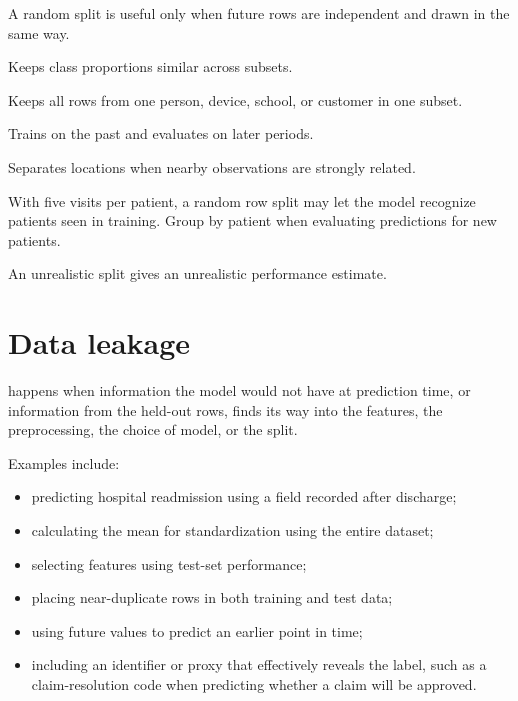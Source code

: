 A random split is useful only when future rows are independent and drawn in the same way.

\begin{description}[leftmargin=1.35in,style=nextline]
  \item[Stratified split] Keeps class proportions similar across subsets.
  \item[Group split] Keeps all rows from one person, device, school, or customer in one subset.
  \item[Time split] Trains on the past and evaluates on later periods.
  \item[Spatial split] Separates locations when nearby observations are strongly related.
\end{description}

\begin{workedexample}
With five visits per patient, a random row split may let the model recognize patients seen in training. Group by patient when evaluating predictions for new patients.
\end{workedexample}

\begin{pitfall}
An unrealistic split gives an unrealistic performance estimate.
\end{pitfall}

\section{Data leakage}
\label{sec:data-leakage}

 happens when information the model would not have at prediction time, or information from the held-out rows, finds its way into the features, the preprocessing, the choice of model, or the split.

Examples include:

\begin{itemize}
  \item predicting hospital readmission using a field recorded after discharge;
  \item calculating the mean for standardization using the entire dataset;
  \item selecting features using test-set performance;
  \item placing near-duplicate rows in both training and test data;
  \item using future values to predict an earlier point in time;
  \item including an identifier or proxy that effectively reveals the label, such as a claim-resolution code when predicting whether a claim will be approved.
\end{itemize}

